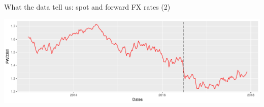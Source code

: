 \begin{frame}[fragile]{What the data tell us: spot and forward FX rates
(2)}

\begin{Shaded}
\begin{Highlighting}[]
\StringTok{ }\OperatorTok{+}\StringTok{ }\NormalTok{(}\NormalTok{) }
\StringTok{ }\OperatorTok{+}\StringTok{ }\NormalTok{(}\NormalTok{(}\NormalTok{((}\NormalTok{))),}
                     \NormalTok{)}
\end{Highlighting}
\end{Shaded}

\includegraphics[width=1\linewidth]{2018_02_07_IMF_FXCourse_files/figure-beamer/unnamed-chunk-9-1}

\end{frame}

